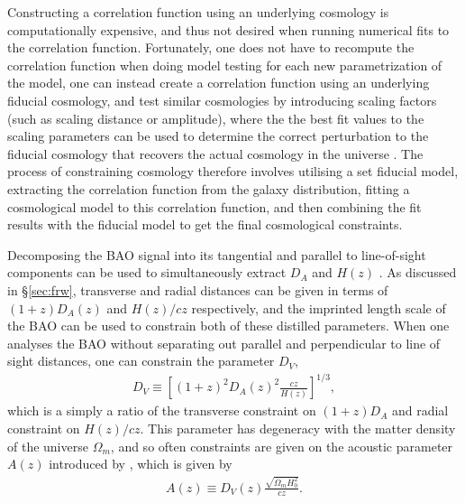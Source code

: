 \documentclass[titlesmallcaps, examinerscopy, copyrightpage]{uqthesis}
\begin{document}
Constructing a correlation function using an underlying cosmology is computationally expensive, and thus not desired when running numerical fits to the correlation function. Fortunately, one does not have to recompute the correlation function when doing model testing for each new parametrization of the model, one can instead create a correlation function using an underlying fiducial cosmology, and test similar cosmologies by introducing scaling factors (such as scaling distance or amplitude), where the the best fit values to the scaling parameters can be used to determine the correct perturbation to the fiducial cosmology that recovers the actual cosmology in the universe \citep{SanchezScoccola2012}. The process of constraining cosmology therefore involves utilising a set fiducial model, extracting the correlation function from the galaxy distribution, fitting a cosmological model to this correlation function, and then combining the fit results with the fiducial model to get the final cosmological constraints.






Decomposing the BAO signal into its tangential and parallel to line-of-sight components can be used to simultaneously extract $D_A$ and $H(z)$ \citep{BlakeGlazebrook2003, SeoEisenstein2003, Wang2006}. As discussed in \S\ref{sec:frw}, transverse and radial distances can be given in terms of $(1+z) D_A(z)$ and $H(z)/cz$ respectively, and the imprinted length scale of the BAO can be used to constrain both of these distilled parameters. When one analyses the BAO without separating out parallel and perpendicular to line of sight distances, one can constrain the parameter $D_V$, 
\begin{align}
D_V \equiv \left[ (1+z)^2 D_A(z)^2 \frac{cz}{H(z)}\right]^{1/3},
\end{align}
which is a simply a ratio of the transverse constraint on $(1+z) D_A$ and radial constraint on $H(z)/cz$. This parameter has degeneracy with the matter density of the universe $\Omega_m$, and so often constraints are given on the acoustic parameter $A(z)$ introduced by \citet{EisensteinZehavi2005}, which is given by
\begin{align}
A(z) \equiv D_V(z) \frac{\sqrt{\Omega_m H_0^2}}{cz}.
\end{align}
\end{document}

